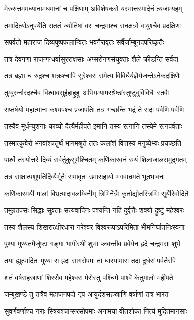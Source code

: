 \twolineshloka
{मेरुरुत्तममध्यानामधमानां च पक्षिणाम्}
{अविशेषकरो यस्मात्तस्मादेनं त्यजाम्यहम्}


\twolineshloka
{तमादित्योऽनुपर्येति सततं ज्योतिषां वरः}
{चन्द्रमाश्च सनक्षत्रो वायुश्चैव प्रदक्षिणः}


\twolineshloka
{सपर्वतो महाराज दिव्यपुष्पफलान्वितः}
{भवनैरावृतः सर्वैर्जाम्बूनदपरिष्कृतैः}


\twolineshloka
{तत्र देवगणा राजन्गन्धर्वासुरराक्षसाः}
{अप्सरोगणसंयुक्ताः शैले क्रीडन्ति सर्वदा}


\twolineshloka
{तत्र ब्रह्मा च रुद्रश्च शक्रश्चापि सुरेश्वरः}
{समेत्य विविधैर्यज्ञैर्यजन्तेऽनेकदक्षिणैः}


\twolineshloka
{तुम्बुरुर्नारदश्चैव विश्वावसुर्हहाहुहूः}
{अभिगम्यामरश्रेष्ठांस्तुष्टुवुर्विविधैः स्तवैः}


\twolineshloka
{सप्तर्षयो महात्मानः कश्यपश्च प्रजापतिः}
{तत्र गच्छन्ति भद्रं ते सदा पर्वणि पर्वणि}


\twolineshloka
{तस्यैव मूर्धन्युशनाः काव्यो दैत्यैर्महीपते}
{इमानि तस्य रत्नानि तस्येमे रत्नपर्वताः}


\twolineshloka
{तस्मात्कुबेरो भगवांश्चतुर्थं भागमश्रुते}
{ततः कलांशं वित्तस्य मनुष्येभ्यः प्रयच्छति}


\twolineshloka
{पार्श्वे तस्योत्तरे दिव्यं सर्वर्तुकुसुमैश्चितम्}
{कर्णिकारवनं रम्यं शिलाजालसमुद्गतम्}


\twolineshloka
{तत्र साक्षात्पशुपतिर्दिव्यैर्भूतैः समावृतः}
{उमासहायो भगवान्रमते भूतभावनः}


\twolineshloka
{कर्णिकारमयी मालां बिभ्रत्पादावलम्बिनीम्}
{त्रिभिर्नेत्रैः कृतोद्योतस्त्रिभिः सूर्यैरिवोदितैः}


\twolineshloka
{तमुग्रतपसः सिद्धाः सुव्रताः सत्यवादिनः}
{पश्यन्ति नहि दुर्वृत्तैः शक्यो द्रुष्टुं महेश्वरः}


\twolineshloka
{तस्य शैलस्य शिखरात्क्षीरधारा नरेश्वर}
{विश्वरूपाऽपरिमिता भीमनिर्घातनिःस्वना}


\twolineshloka
{पुण्या पुण्यतमैर्जुष्टा गङ्गा भागीरथी शुभा}
{प्लवन्तीव प्रवेगेन ह्रदे चन्द्रमसः शुभे}


\twolineshloka
{तया ह्युत्पादितः पुण्यः स ह्रदः सागरोपमः}
{तां धारयामास तदा दुर्धरां पर्वतैरपि}


\twolineshloka
{शतं वर्षसहस्राणां शिरसैव महेश्वरः}
{मेरोस्तु पश्चिमे पार्श्वे केतुमालो महीपते}


\twolineshloka
{जम्बूखण्डे तु तत्रैव महाजनपदो नृप}
{आयुर्दशसहस्राणि वर्षाणां तत्र भारत}


\twolineshloka
{सुवर्णवर्णाश्च नराः स्त्रियश्चाप्सरसोपमाः}
{अनामया वीतशोका नित्यं मुदितमानसाः}


